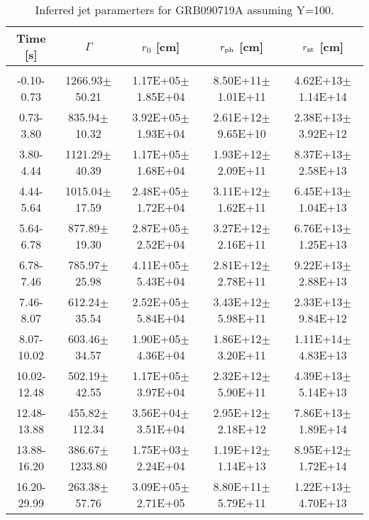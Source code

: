 \begin{table}[htp]
\scriptsize
\label{tab:}
\begin{tabular}{c c c c c}
Time [s] & $\Gamma$ & $r_0$ [cm] & $r_{\rm ph}$ [cm] & $r_{\rm nt}$ [cm] \\
\hline \hline\\ 

-0.10-0.73 & 1266.93$\pm$50.21 & 1.17E+05$\pm$1.85E+04 & 8.50E+11$\pm$1.01E+11 & 4.62E+13$\pm$1.14E+14 \\ 

0.73-3.80 & 835.94$\pm$10.32 & 3.92E+05$\pm$1.93E+04 & 2.61E+12$\pm$9.65E+10 & 2.38E+13$\pm$3.92E+12 \\ 

3.80-4.44 & 1121.29$\pm$40.39 & 1.17E+05$\pm$1.68E+04 & 1.93E+12$\pm$2.09E+11 & 8.37E+13$\pm$2.58E+13 \\ 

4.44-5.64 & 1015.04$\pm$17.59 & 2.48E+05$\pm$1.72E+04 & 3.11E+12$\pm$1.62E+11 & 6.45E+13$\pm$1.04E+13 \\ 

5.64-6.78 & 877.89$\pm$19.30 & 2.87E+05$\pm$2.52E+04 & 3.27E+12$\pm$2.16E+11 & 6.76E+13$\pm$1.25E+13 \\ 

6.78-7.46 & 785.97$\pm$25.98 & 4.11E+05$\pm$5.43E+04 & 2.81E+12$\pm$2.78E+11 & 9.22E+13$\pm$2.88E+13 \\ 

7.46-8.07 & 612.24$\pm$35.54 & 2.52E+05$\pm$5.84E+04 & 3.43E+12$\pm$5.98E+11 & 2.33E+13$\pm$9.84E+12 \\ 

8.07-10.02 & 603.46$\pm$34.57 & 1.90E+05$\pm$4.36E+04 & 1.86E+12$\pm$3.20E+11 & 1.11E+14$\pm$4.83E+13 \\ 

10.02-12.48 & 502.19$\pm$42.55 & 1.17E+05$\pm$3.97E+04 & 2.32E+12$\pm$5.90E+11 & 4.39E+13$\pm$5.14E+13 \\ 

12.48-13.88 & 455.82$\pm$112.34 & 3.56E+04$\pm$3.51E+04 & 2.95E+12$\pm$2.18E+12 & 7.86E+13$\pm$1.89E+14 \\ 

13.88-16.20 & 386.67$\pm$1233.80 & 1.75E+03$\pm$2.24E+04 & 1.19E+12$\pm$1.14E+13 & 8.95E+12$\pm$1.72E+14 \\ 

16.20-29.99 & 263.38$\pm$57.76 & 3.09E+05$\pm$2.71E+05 & 8.80E+11$\pm$5.79E+11 & 1.22E+13$\pm$4.70E+13 \\ 

\end{tabular}
\caption{Inferred jet paramerters for GRB090719A assuming Y=100.}
\end{table}
